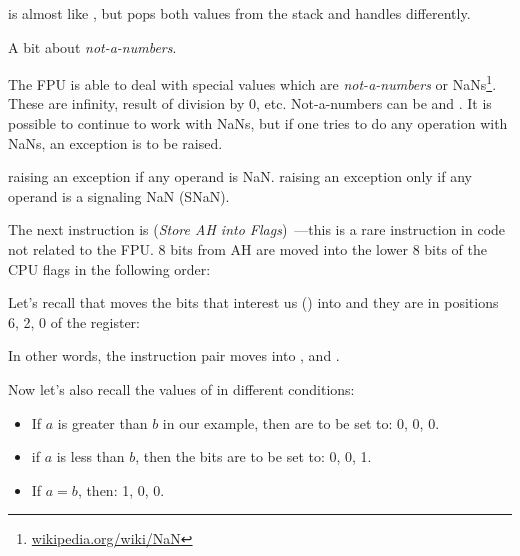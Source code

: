 



\FUCOMPP{} is almost like \FCOM, but pops both values from the stack and handles
 differently.

A bit about \emph{not-a-numbers}.

\newcommand{\NANFN}{\footnote{\href{http://go.yurichev.com/17130}{wikipedia.org/wiki/NaN}}}

The FPU is able to deal with special values which are \emph{not-a-numbers} or \gls{NaN}s\NANFN. 
These are infinity, result of division by 0, etc.
Not-a-numbers can be  and . It is possible to continue to work with  NaNs, 
but if one tries to do any operation with  NaNs, an exception is to be raised.


\FCOM raising an exception if any operand is \gls{NaN}. 
\FUCOM raising an exception only if any operand is a signaling \gls{NaN} (SNaN).

\label{SAHF}

The next instruction is \SAHF (\emph{Store AH into Flags})~---this is a rare 
instruction in code not related to the FPU. 
8 bits from AH are moved into the lower 8 bits of the CPU flags in the following order:




Let's recall that \FNSTSW moves the bits that interest us (\CThreeBits) into \AH 
and they are in positions 6, 2, 0 of the \AH register:



In other words, the  instruction pair moves \CThreeBits into \ZF, \PF and \CF.

Now let's also recall the values of \CThreeBits in different conditions:

\begin{itemize}
\item If $a$ is greater than $b$ in our example, then \CThreeBits are to be set to: 0, 0, 0.
\item if $a$ is less than $b$, then the bits are to be set to: 0, 0, 1.
\item If $a=b$, then: 1, 0, 0.
\end{itemize}


